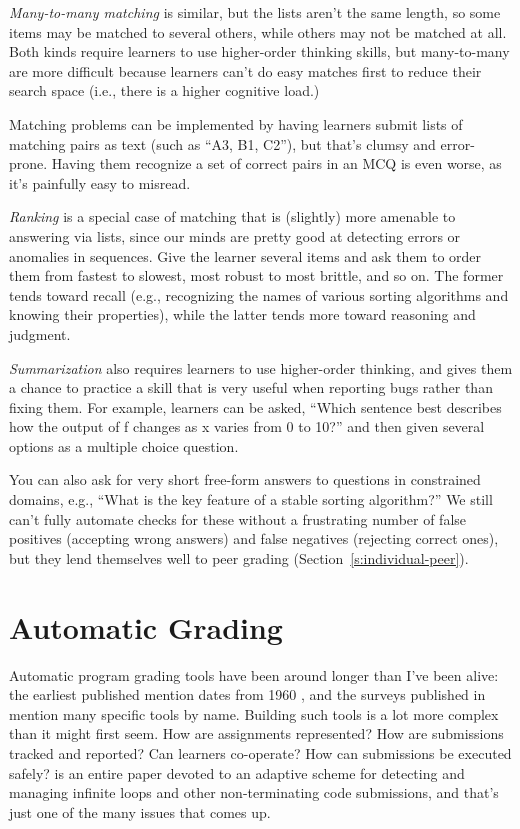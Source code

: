 \emph{Many-to-many matching} is similar, but the lists aren't the same
length, so some items may be matched to several others, while others may
not be matched at all. Both kinds require learners to use higher-order
thinking skills, but many-to-many are more difficult because learners
can't do easy matches first to reduce their search space (i.e., there is
a higher cognitive load.)

Matching problems can be implemented by having learners submit lists of
matching pairs as text (such as ``A3, B1, C2''), but that's clumsy and
error-prone. Having them recognize a set of correct pairs in an MCQ is
even worse, as it's painfully easy to misread.

\emph{Ranking} is a special case of matching that is (slightly) more amenable
to answering via lists, since our minds are pretty good at detecting
errors or anomalies in sequences. Give the learner several items and ask
them to order them from fastest to slowest, most robust to most brittle,
and so on. The former tends toward recall (e.g., recognizing the names
of various sorting algorithms and knowing their properties), while the
latter tends more toward reasoning and judgment.

\emph{Summarization} also requires learners to use higher-order thinking, and
gives them a chance to practice a skill that is very useful when
reporting bugs rather than fixing them. For example, learners can be
asked, ``Which sentence best describes how the output of f changes as x
varies from 0 to 10?'' and then given several options as a multiple
choice question.

You can also ask for very short free-form answers to questions in
constrained domains, e.g., ``What is the key feature of a stable sorting
algorithm?'' We still can't fully automate checks for these without a
frustrating number of false positives (accepting wrong answers) and
false negatives (rejecting correct ones), but they lend themselves well
to peer grading (Section~\ref{s:individual-peer}).

\section{Automatic Grading}\label{s:exercises-grading}

Automatic program grading tools have been around longer than I've been
alive: the earliest published mention dates from 1960
\cite{Holl1960}, and the surveys published in
\cite{Douc2005,Ihan2010} mention many specific tools by name.
Building such tools is a lot more complex than it might first seem. How
are assignments represented? How are submissions tracked and reported?
Can learners co-operate? How can submissions be executed safely?
\cite{Edwa2014a} is an entire paper devoted to an adaptive scheme for
detecting and managing infinite loops and other non-terminating code
submissions, and that's just one of the many issues that comes up.

